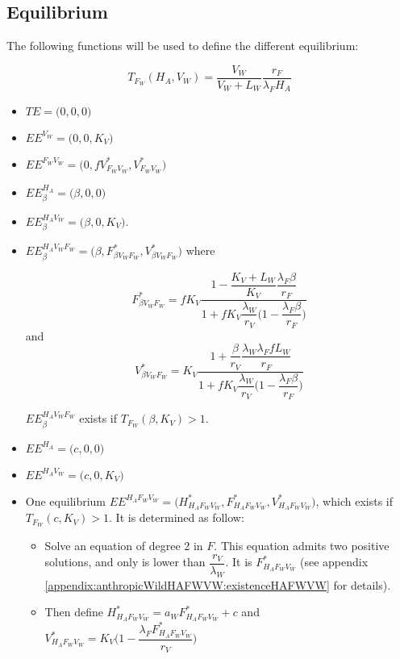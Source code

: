 \documentclass{article}
\newcommand{\lfw}{\lambda_{F}}
\newcommand{\lfv}{\lambda_{W}}
\begin{document}
\subsection{Equilibrium}


The following functions will be used to define the different equilibrium:

\begin{equation}
T_{F_W}(H_A, V_W) = \dfrac{V_W}{V_W + L_W} \dfrac{r_F}{\lfw H_A}
\end{equation}

\begin{itemize}
\item $TE = \Big(0,0,0\Big)$
\item $EE^{V_W} = \Big(0,0 ,K_V\Big)$
\item $EE^{F_WV_W} = \Big(0, fV^*_{F_WV_W},V^*_{F_WV_W}\Big)$
\item $EE^{H_A}_\beta = \Big(\beta,0,0\Big)$
\item $EE^{H_AV_W}_\beta = \Big(\beta,0,K_V\Big)$.
\item $EE^{H_AV_WF_W}_\beta = \Big(\beta,F_{\beta V_WF_W}^*,V_{\beta V_WF_W}^*\Big)$ where

$$F_{\beta V_WF_W}^* = fK_V \dfrac{1 - \dfrac{K_V + L_W}{K_V}\dfrac{\lfw \beta}{r_F}}{1 + f K_V \dfrac{\lfv}{r_V} \Big(1 - \dfrac{\lfw \beta}{r_F}\Big)} $$
and
$$V_{\beta V_WF_W}^* = K_V \dfrac{1 + \dfrac{\beta}{r_V}\dfrac{\lfv \lfw f L_W}{r_F} }{1 + fK_V\dfrac{\lfv}{r_V}\Big(1 - \dfrac{\lfw \beta}{r_F}\Big)}
$$

$EE^{H_AV_WF_W}_\beta$ exists if $T_{F_W}(\beta, K_V) > 1$.

\item $EE^{H_A} = \Big(c, 0, 0\Big)$
\item $EE^{H_AV_W} = \Big(c, 0, K_V\Big)$
\item One equilibrium $EE^{H_AF_WV_W} = \Big(H^*_{H_AF_WV_W}, F^*_{H_AF_WV_W}, V^*_{H_AF_WV_W} \Big)$, which exists if $T_{F_W}(c, K_V) > 1$. It is determined as follow:

\begin{itemize}
\item Solve an equation of degree 2 in $F$. This equation admits two positive solutions, and only is lower than $\dfrac{r_V}{\lfv}$. It is $F^*_{H_AF_WV_W}$ (see appendix \ref{appendix:anthropicWildHAFWVW:existenceHAFWVW} for details). 
\item Then define $H_{H_AF_WV_W}^* = a_W F^*_{H_AF_WV_W} + c$ and $V^*_{H_AF_WV_W} = K_V \Big(1 - \dfrac{\lfw F^*_{H_AF_WV_W}}{r_V} \Big)$
\end{itemize}

\end{itemize}
\end{document}

